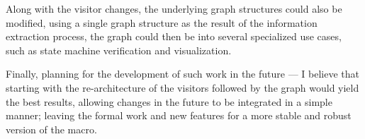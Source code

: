 Along with the visitor changes, the underlying graph structures could also be modified,
using a single graph structure as the result of the information extraction process,
the graph could then be  into several specialized use cases, such as state machine verification and visualization.

Finally, planning for the development of such work in the future ---
I believe that starting with the re-architecture of the visitors followed by the graph would yield the best results,
allowing changes in the future to be integrated in a simple manner;
leaving the formal work and new features for a more stable and robust version of the macro.
